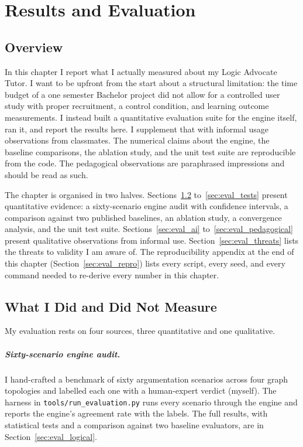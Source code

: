 \chapter{Results and Evaluation}
\label{ch:results}

\section{Overview}
In this chapter I report what I actually measured about my Logic Advocate Tutor. I want to be upfront from the start about a structural limitation: the time budget of a one semester Bachelor project did not allow for a controlled user study with proper recruitment, a control condition, and learning outcome measurements. I instead built a quantitative evaluation suite for the engine itself, ran it, and report the results here. I supplement that with informal usage observations from classmates. The numerical claims about the engine, the baseline comparisons, the ablation study, and the unit test suite are reproducible from the code. The pedagogical observations are paraphrased impressions and should be read as such.

The chapter is organised in two halves. Sections~\ref{sec:eval_methodology} to~\ref{sec:eval_tests} present quantitative evidence: a sixty-scenario engine audit with confidence intervals, a comparison against two published baselines, an ablation study, a convergence analysis, and the unit test suite. Sections~\ref{sec:eval_ai} to~\ref{sec:eval_pedagogical} present qualitative observations from informal use. Section~\ref{sec:eval_threats} lists the threats to validity I am aware of. The reproducibility appendix at the end of this chapter (Section~\ref{sec:eval_repro}) lists every script, every seed, and every command needed to re-derive every number in this chapter.

\section{What I Did and Did Not Measure}
\label{sec:eval_methodology}
My evaluation rests on four sources, three quantitative and one qualitative.

\paragraph{Sixty-scenario engine audit.}
I hand-crafted a benchmark of sixty argumentation scenarios across four graph topologies and labelled each one with a human-expert verdict (myself). The harness in \texttt{tools/run\_evaluation.py} runs every scenario through the engine and reports the engine's agreement rate with the labels. The full results, with statistical tests and a comparison against two baseline evaluators, are in Section~\ref{sec:eval_logical}.

